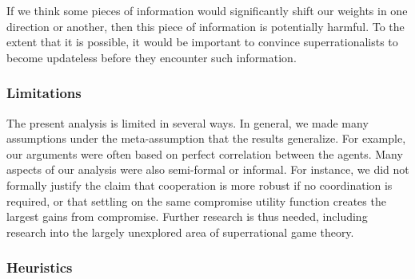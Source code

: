 If we think some pieces of information would significantly shift our
weights in one direction or another, then this piece of information is
potentially harmful. To the extent that it is possible, it would be
important to convince superrationalists to become updateless before they
encounter such information.

\subsubsection{Limitations}\label{limitations}

The present analysis is limited in several ways. In general, we made
many assumptions under the meta-assumption that the results generalize.
For example, our arguments were often based on perfect correlation
between the agents. Many aspects of our analysis were also semi-formal
or informal. For instance, we did not formally justify the claim that
cooperation is more robust if no coordination is required, or that
settling on the same compromise utility function creates the largest
gains from compromise. Further research is thus needed, including
research into the largely unexplored area of superrational game theory.

\subsubsection{Heuristics}\label{heuristics}

